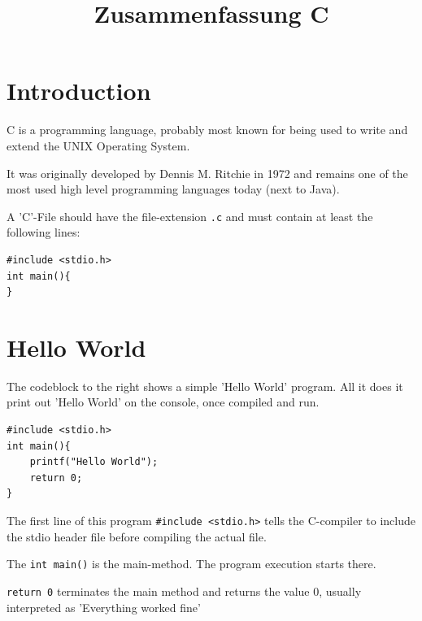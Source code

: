 \documentclass[a4paper, 11pt]{article}
\newcommand{\code}[1]{\texttt{#1}}
\begin{document}
\title{Zusammenfassung C}
\maketitle

\tableofcontents

\newpage

\section{Introduction}

C is a programming language, probably most known for being used to write and extend the UNIX Operating System.

It was originally developed by Dennis M. Ritchie in 1972 and remains one of the most used high level programming languages today (next to Java).

A 'C'-File should have the file-extension \code{.c} and must contain at least the following lines:

\begin{lstlisting}
#include <stdio.h>
int main(){
}
\end{lstlisting}

\section{Hello World}
\begin{minipage}{0.6\textwidth}
    The codeblock to the right shows a simple 'Hello World' program. All it does it print out 'Hello World' on the console, once compiled and run.
\end{minipage}\hfill
\begin{minipage}{0.35\textwidth}
    \begin{lstlisting}
#include <stdio.h>
int main(){
    printf("Hello World");
    return 0;
}
    \end{lstlisting}
\end{minipage}

The first line of this program \code{\#include <stdio.h>} tells the C-compiler to include the stdio header file before compiling the actual file.

The \code{int main()} is the main-method. The program execution starts there.

\code{return 0} terminates the main method and returns the value 0, usually interpreted as 'Everything worked fine'

\vspace{10px}
\end{document}
